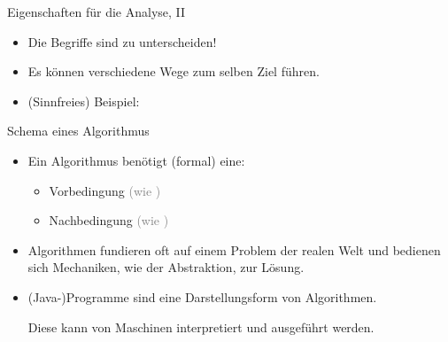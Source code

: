 \begin{frame}{Eigenschaften für die Analyse, II}
    \bigskip
    \begin{itemize}
        \item<6-> Die Begriffe sind zu unterscheiden!
        \item<7-> Es können verschiedene Wege zum selben Ziel führen.
        \item<8-> (Sinnfreies) Beispiel: \smallskip\par
    \end{itemize}
\end{frame}


\begin{frame}{Schema eines Algorithmus}
    \pause\begin{center}
    \end{center}
    \begin{itemize}[<+(1)->]
        \widei
        \item Ein Algorithmus benötigt (formal) eine: \begin{itemize}
            \item Vorbedingung \textcolor{gray}{(wie )}
            \item Nachbedingung \textcolor{gray}{(wie )}
        \end{itemize}
        \item Algorithmen fundieren oft auf einem Problem der realen Welt und bedienen sich Mechaniken, wie der Abstraktion, zur Lösung.
        \item (Java-)Programme sind eine Darstellungsform von Algorithmen.\par\pause{}
              Diese kann von Maschinen interpretiert und ausgeführt werden.
     \end{itemize}
\end{frame}

